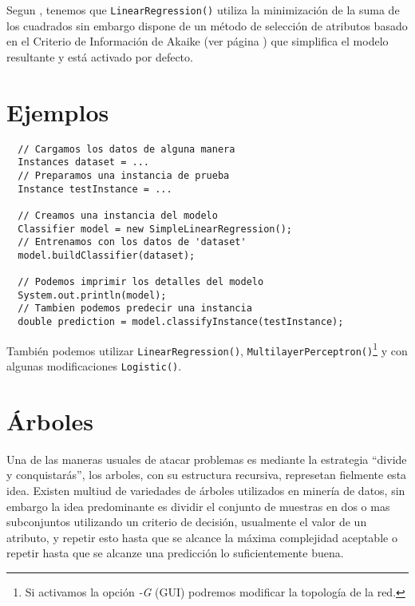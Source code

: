 \documentclass[10pt,a4paper]{article}
\begin{document}
Segun \cite{witten2011data}, tenemos que \lstinline{LinearRegression()} utiliza la minimización de la suma de los cuadrados sin embargo dispone de un método de selección de atributos basado en el Criterio de Información de Akaike (ver página \pageref{modelselection_aic}) que simplifica el modelo resultante y está activado por defecto.

\section{Ejemplos}

\begin{lstlisting}
  // Cargamos los datos de alguna manera
  Instances dataset = ...
  // Preparamos una instancia de prueba
  Instance testInstance = ...
  
  // Creamos una instancia del modelo
  Classifier model = new SimpleLinearRegression();
  // Entrenamos con los datos de 'dataset'
  model.buildClassifier(dataset);
  
  // Podemos imprimir los detalles del modelo
  System.out.println(model);
  // Tambien podemos predecir una instancia
  double prediction = model.classifyInstance(testInstance);
\end{lstlisting}

También podemos utilizar \lstinline{LinearRegression()}, \lstinline{MultilayerPerceptron()}\footnote{Si activamos la opción \textit{-G} (GUI) podremos modificar la topología de la red.} y con algunas modificaciones \lstinline{Logistic()}.


\section{Árboles}
Una de las maneras usuales de atacar problemas es mediante la estrategia ``divide y conquistarás'', los arboles, con su estructura recursiva, represetan fielmente esta idea. Existen multiud de variedades de árboles utilizados en minería de datos, sin embargo la idea predominante es dividir el conjunto de muestras en dos o mas subconjuntos utilizando un criterio de decisión, usualmente el valor de un atributo, y repetir esto hasta que se alcance la máxima complejidad aceptable o repetir hasta que se alcanze una predicción lo suficientemente buena.
\end{document}
